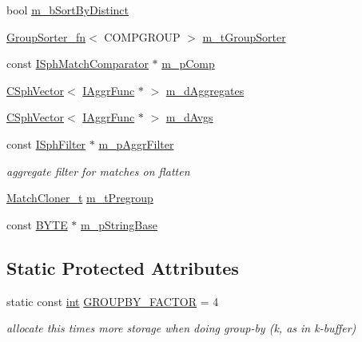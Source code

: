 \begin{DoxyCompactItemize}
bool \hyperlink{classCSphKBufferNGroupSorter_a998b99daf43e28edc920237c62e692db}{m\-\_\-b\-Sort\-By\-Distinct}
\item 
\hyperlink{structGroupSorter__fn}{Group\-Sorter\-\_\-fn}$<$ C\-O\-M\-P\-G\-R\-O\-U\-P $>$ \hyperlink{classCSphKBufferNGroupSorter_a145142e70a48058d82965c6a5aa658b5}{m\-\_\-t\-Group\-Sorter}
\item 
const \hyperlink{structISphMatchComparator}{I\-Sph\-Match\-Comparator} $\ast$ \hyperlink{classCSphKBufferNGroupSorter_ad83276c004fa80329903c903b6b2fcba}{m\-\_\-p\-Comp}
\item 
\hyperlink{classCSphVector}{C\-Sph\-Vector}$<$ \hyperlink{classIAggrFunc}{I\-Aggr\-Func} $\ast$ $>$ \hyperlink{classCSphKBufferNGroupSorter_a1b9ae0c8bfc629e850f8be009d895e30}{m\-\_\-d\-Aggregates}
\item 
\hyperlink{classCSphVector}{C\-Sph\-Vector}$<$ \hyperlink{classIAggrFunc}{I\-Aggr\-Func} $\ast$ $>$ \hyperlink{classCSphKBufferNGroupSorter_a14b376d31c74ed1bd99587aa91c7a68f}{m\-\_\-d\-Avgs}
\item 
const \hyperlink{structISphFilter}{I\-Sph\-Filter} $\ast$ \hyperlink{classCSphKBufferNGroupSorter_accb42324fca2c452e69aecd5c15faa22}{m\-\_\-p\-Aggr\-Filter}
\begin{DoxyCompactList}\small\item\em aggregate filter for matches on flatten \end{DoxyCompactList}\item 
\hyperlink{structMatchCloner__t}{Match\-Cloner\-\_\-t} \hyperlink{classCSphKBufferNGroupSorter_a3122bd4d25253d184cdacee1edee78d7}{m\-\_\-t\-Pregroup}
\item 
const \hyperlink{sphinxstd_8h_a4ae1dab0fb4b072a66584546209e7d58}{B\-Y\-T\-E} $\ast$ \hyperlink{classCSphKBufferNGroupSorter_a9679071285ab6114a04d2dcc628606ca}{m\-\_\-p\-String\-Base}
\end{DoxyCompactItemize}
\subsection*{Static Protected Attributes}
\begin{DoxyCompactItemize}
\item 
static const \hyperlink{sphinxexpr_8cpp_a4a26e8f9cb8b736e0c4cbf4d16de985e}{int} \hyperlink{classCSphKBufferNGroupSorter_a07f6ccd2070b102cb2fa928cc6a0c46b}{G\-R\-O\-U\-P\-B\-Y\-\_\-\-F\-A\-C\-T\-O\-R} = 4
\begin{DoxyCompactList}\small\item\em allocate this times more storage when doing group-\/by (k, as in k-\/buffer) \end{DoxyCompactList}\end{DoxyCompactItemize}
